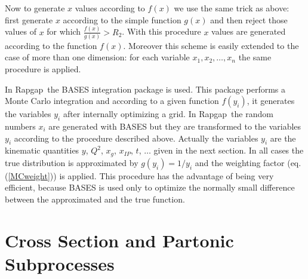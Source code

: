 \documentclass[10pt]{article} \usepackage{dina4}
\newcommand{\pom}{I\!\!P}
\newcommand{\xpom}{x_{\pom}}
\def\RAPGAP{{\sc Rapgap}}
\begin{document}
\par
Now to generate $x$ values according to $f(x)$ we use the same trick
as above: first generate $x$ according to the simple function $g(x)$ 
and then reject those values of $x$ for which $\frac{f(x)}{g(x)} > R_2$.
With this procedure $x$ values are generated according to the function
$f(x)$. Moreover this scheme is easily extended to the case of 
more than one dimension: for each variable $x_1,x_2,\ldots,x_n$ the same
procedure is applied.
\par
In \RAPGAP\ the BASES \cite{bases} integration package is used. 
This package performs a Monte Carlo integration and according to a given 
function $f(y_i)$, it generates the variables $y_i$ after internally 
optimizing a grid. In \RAPGAP\ the random numbers $x_i$ are 
generated with BASES but they are transformed to the variables $y_i$ 
according to the procedure described above. Actually the variables 
$y_i$ are the kinematic quantities $y$, $Q^2$, $x_g$, $\xpom$, $t$, $\ldots$ 
given in the next section. In all cases the true distribution is 
approximated by $g(y_i) = 1/y_i$ and the weighting factor 
(eq.(\ref{MCweight})) is applied. This procedure has the 
advantage of being very efficient, because BASES is used only to optimize
the normally small difference between the approximated and the true 
function. 

\section{Cross Section and Partonic Subprocesses}

\end{document}
